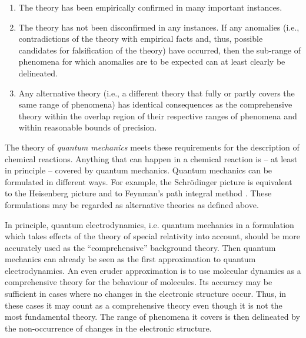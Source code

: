 \documentclass[12pt, a4paper]{article}
\numberwithin{equation}{section}
\begin{document}
\begin{enumerate}
  \item The theory has been empirically confirmed in many
  important instances.
\item The theory has not been disconfirmed in any instances. If any
  anomalies (i.e., contradictions of the theory with empirical facts
  and, thus, possible candidates for falsification of the theory) have
  occurred, then the sub-range of phenomena for which anomalies are to
  be expected can at least clearly be delineated.
  \item Any alternative theory (i.e., a different theory that fully or
  partly covers the same range of phenomena) has identical consequences
  as the comprehensive theory within the overlap region of their respective
  ranges of phenomena and within reasonable bounds of precision.
\end{enumerate}

The theory of \emph{quantum mechanics} meets these requirements
for the description of chemical reactions. Anything that can happen in a
chemical reaction is -- at least in principle -- covered by quantum
mechanics. Quantum mechanics can be formulated in different ways. For example,
the Schrödinger picture is equivalent to the Heisenberg picture and to
Feynman's path integral method \citep{jen98}. These formulations may be
regarded as alternative theories as defined above.


In principle, quantum electrodynamics, i.e. quantum mechanics in a
formulation which takes effects of the theory of special relativity into
account, should be more accurately used as the ``comprehensive'' background
theory. Then quantum mechanics can already be seen as the first approximation to
quantum electrodynamics.  An even cruder approximation is to use
molecular dynamics as a comprehensive theory for the behaviour of
molecules. Its accuracy may be sufficient in cases where no changes in
the electronic structure occur. Thus, in these cases it may count as a
comprehensive theory even though it is not the most fundamental
theory. The range of phenomena it covers is then delineated by the
non-occurrence of changes in the electronic structure.
\end{document}
